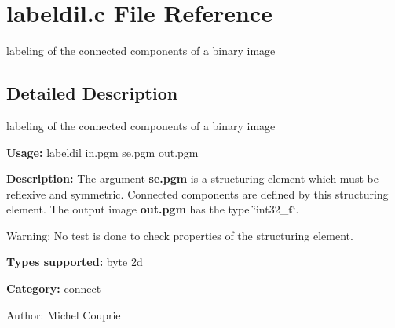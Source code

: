 \section{labeldil.c File Reference}
\label{labeldil_8c}
labeling of the connected components of a binary image 



\subsection{Detailed Description}
labeling of the connected components of a binary image 

{\bf Usage:} labeldil in.pgm se.pgm out.pgm

{\bf Description:} The argument {\bf se.pgm} is a structuring element which must be reflexive and symmetric. Connected components are defined by this structuring element. The output image {\bf out.pgm} has the type \char`\"{}int32\_\-t\char`\"{}.

\begin{Desc}
\item[Warning:]No test is done to check properties of the structuring element.\end{Desc}
{\bf Types supported:} byte 2d

{\bf Category:} connect

\begin{Desc}
\item[Author:]Michel Couprie \end{Desc}
